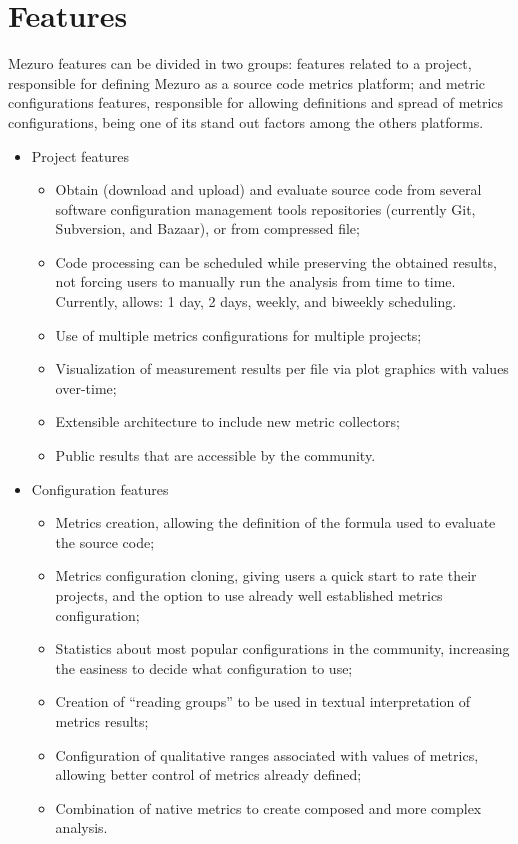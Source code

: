 \section{Features}
\label{sec:features}

Mezuro features can be divided in two groups: features related to a project,
responsible for defining Mezuro as a source code metrics platform; and
metric configurations features, responsible for allowing definitions and
spread of metrics configurations, being one of its stand out factors among the
others platforms.

\begin{itemize}
    \item Project features
    \begin{itemize}
        \item Obtain (download and upload) and evaluate source code from
            several software configuration management tools repositories
            (currently Git, Subversion, and Bazaar), or from compressed file;
        \item Code processing can be scheduled while preserving the obtained
            results, not forcing users to manually run the analysis from time
            to time. Currently, allows: 1 day, 2 days, weekly, and biweekly
            scheduling.
        \item Use of multiple metrics configurations for multiple projects;
        \item Visualization of measurement results per file via plot graphics
            with values over-time;
        \item Extensible architecture to include new metric collectors;
        \item Public results that are accessible by the community.
    \end{itemize}

    \item Configuration features
    \begin{itemize}
        \item Metrics creation, allowing the definition of the formula used
            to evaluate the source code;
        \item Metrics configuration cloning, giving users a quick start to rate
            their projects, and the option to use already well established
            metrics configuration;
        \item Statistics about most popular configurations in the community,
            increasing the easiness to decide what configuration to use;
        \item Creation of ``reading groups'' to be used in textual
            interpretation of metrics results;
        \item Configuration of qualitative ranges associated with values of
            metrics, allowing better control of metrics already defined;
        \item Combination of native metrics to create composed and more complex
            analysis.
    \end{itemize}
\end{itemize}

